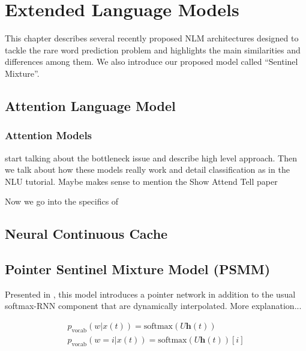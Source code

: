 \chapter{Extended Language Models}

This chapter describes several recently proposed NLM architectures designed to tackle the rare word prediction problem and highlights the main similarities and differences among them. We also introduce our proposed model called ``Sentinel Mixture''.

\section{Attention Language Model}
\label{sec:attention}

\subsection{Attention Models}

\cite{bahdanau2014neural} start talking about the bottleneck issue and describe high level approach. Then we talk about how these models really work and detail classification as in the NLU tutorial. Maybe makes sense to mention the Show Attend Tell paper

Now we go into the specifics of \cite{daniluk2017frustratingly}

\section{Neural Continuous Cache}
\label{sec:continuousCache}

\cite{grave2016improving}

\section{Pointer Sentinel Mixture Model (PSMM)}
\label{sec:pointerMixture}

Presented in \cite{merity2016pointer}, this model introduces a pointer network in addition to the usual softmax-RNN component that are dynamically interpolated. More explanation...

\begin{equation} \label{eq:psmmMemory}
	\begin{gathered}
		p_{\text{vocab}}(w|x(t)) = \text{softmax}(U\mathbf{h}(t))  \\
		p_{\text{vocab}}(w=i|x(t)) = \text{softmax}(U\mathbf{h}(t))[i] 
	\end{gathered}	
\end{equation}

